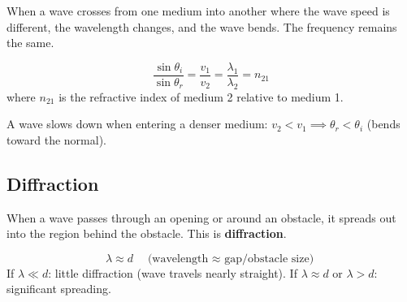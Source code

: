 When a wave crosses from one medium into another
where the wave speed is different, the wavelength
changes, and the wave bends. The frequency remains
the same.

\begin{lawbox}
\[
  \frac{\sin\theta_i}{\sin\theta_r}
  = \frac{v_1}{v_2}
  = \frac{\lambda_1}{\lambda_2}
  = n_{21}
\]
where $n_{21}$ is the refractive index of medium 2
relative to medium 1.

A wave slows down when entering a denser medium:
$v_2 < v_1 \implies \theta_r < \theta_i$
(bends toward the normal).
\end{lawbox}

\subsection{Diffraction}

When a wave passes through an opening or around an
obstacle, it spreads out into the region behind the
obstacle. This is \textbf{diffraction}.

\begin{keybox}
\[
  \lambda \approx d \quad \text{(wavelength
  $\approx$ gap/obstacle size)}
\]
If $\lambda \ll d$: little diffraction (wave travels
nearly straight). If $\lambda \approx d$ or
$\lambda > d$: significant spreading.
\end{keybox}

